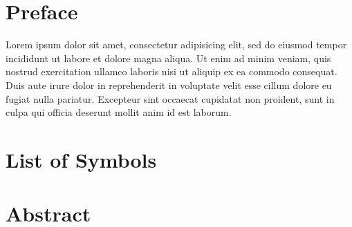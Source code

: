 \chapter{Preface}
\begin{onehalfspace}
Lorem ipsum dolor sit amet, consectetur adipisicing elit, sed do eiusmod
tempor incididunt ut labore et dolore magna aliqua. Ut enim ad minim veniam,
quis nostrud exercitation ullamco laboris nisi ut aliquip ex ea commodo
consequat. Duis aute irure dolor in reprehenderit in voluptate velit esse
cillum dolore eu fugiat nulla pariatur. Excepteur sint occaecat cupidatat non
proident, sunt in culpa qui officia deserunt mollit anim id est laborum.
\end{onehalfspace}


\clearpage
{}
\renewcommand*{\contentsname}{Table of Contents}
{\hypersetup{linkcolor=black}\tableofcontents}

\clearpage
{}
{}
{\hypersetup{linkcolor=black}\listoffigures}

\clearpage
{}
{}
{\hypersetup{linkcolor=black}\listoftables}


\clearpage
{\hypersetup{linkcolor=black}\listofappendices}

\clearpage
{}
{}
\printglossary[type=\acronymtype, title={List of Acronyms}]

\chapter{List of Symbols}


\chapter{Abstract}
\onehalfspacing



% 
